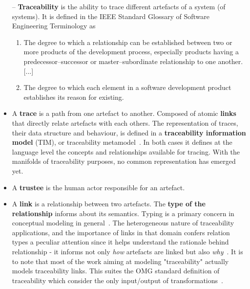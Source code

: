 \begin{itemize}
	\renewcommand\labelitemi{--}
	\item[--] \textbf{Traceability} is the ability to trace different artefacts of a system (of systems). It is defined in the IEEE Standard Glossary of Software Engineering Terminology \cite{ieeeglossary-se} as 
	\begin{enumerate}
		\item The degree to which a relationship can be established between two or more products of the development process, especially products having a predecessor–successor or master–subordinate relationship to one another. [...]
		\item The degree to which each element in a software development product establishes its reason for existing.
	\end{enumerate}
	
	
	\item A \textbf{trace} is a path from one artefact to another. Composed of atomic \textbf{links} that directly relate artefacts with each others. The representation of traces, their data structure and behaviour, is defined in a \textbf{traceability information model} (TIM), or traceability metamodel~\cite{drivalos2009-engineering-DSL-for-traceability}. In both cases it defines at the language level the concepts and relationships available for tracing. With the manifolds of traceability purposes, no common representation has emerged yet. 
	
	\item A \textbf{trustee} is the human actor responsible for an artefact.
	
	\item A \textbf{link} is a relationship between two artefacts. The \textbf{type of the relationship} informs about its semantics. Typing is a primary concern in conceptual modeling in general~\cite{olive2002-representation-of-generic-relationship-types-in-modeling}. The heterogeneous nature of traceability applications, and the importance of links in that domain confers relation types a peculiar attention since it helps understand the rationale behind relationship - it informs not only \textit{how} artefacts are linked but also \textit{why}~\cite{mader2009-motivation-matters-in-traceability-practitioner-survey}. It is to note that most of the work aiming at modeling "traceability" actually models traceability links. This suites the OMG standard definition of traceability which consider the only input/output of transformations~\cite{winkler2010-survey-traceability-and-MDE}. 
	

\end{itemize}
